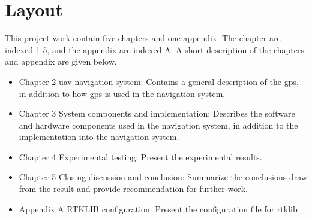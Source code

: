 
\section{Layout}
This project work contain five chapters and one appendix. The chapter are indexed 1-5, and the appendix are indexed A. A short description of the chapters and appendix are given below.
\begin{itemize}
\item Chapter 2 \gls{uav} navigation system: Contains a general description of the \acrfull{gps}, in addition to how \gls{gps} is used in the navigation system.
\item Chapter 3 System components and implementation: Describes the software and hardware components used in the navigation system, in addition to the implementation into the navigation system.
\item Chapter 4 Experimental testing: Present the experimental results.
\item Chapter 5 Closing discussion and conclusion: Summarize the conclusions draw from the result and provide recommendation for further work.
\item Appendix A RTKLIB configuration: Present the configuration file for \gls{rtklib}

\end{itemize}
\cleardoublepage